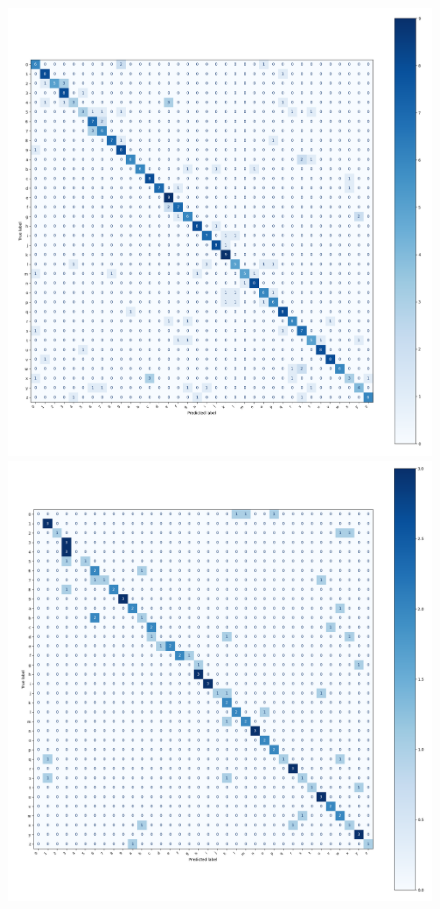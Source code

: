 \documentclass[a4paper,11pt,twoside]{report}
\theoremstyle{definition}
\begin{document}
\begin{figure}[h!]
  \centering
  \begin{minipage}{0.49\linewidth}
      \centering
      \includegraphics[width=\linewidth]{img_results/cm_noisy_alphanum_noisy.png}
      \subcaption{}
  \end{minipage}
  \hfill
  \begin{minipage}{0.49\linewidth}
      \centering
      \includegraphics[width=\linewidth]{img_results/cm_noisy_alphanum_mac.png}
      \subcaption{}
  \end{minipage}


\end{figure}
\end{document}
